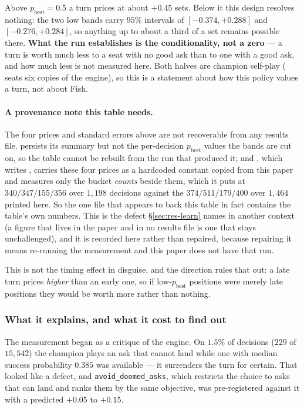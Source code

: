 \documentclass[11pt,letterpaper]{article}
\begin{document}
Above $p_{\text{best}} = 0.5$ a turn prices at about $+0.45$ sets. Below it
this design resolves nothing: the two low bands carry $95\%$ intervals of
$[-0.374, +0.288]$ and $[-0.276, +0.284]$, so anything up to about a third of a
set remains possible there. \textbf{What the run establishes is the
conditionality, not a zero} --- a turn is worth much less to a seat with no
good ask than to one with a good ask, and how much less is not measured here.
Both halves are champion self-play ( seats six
copies of the engine), so this is a statement about how this policy values a
turn, not about Fish.

\paragraph{A provenance note this table needs.} The four prices and standard
errors above are not recoverable from any results file.
 persists its summary but not the per-decision
$p_{\text{best}}$ values the bands are cut on, so the table cannot be rebuilt
from the run that produced it; and , which
writes , carries these four prices as a
hardcoded constant copied from this paper and measures only the bucket
\emph{counts} beside them, which it puts at $340/347/155/356$ over $1{,}198$
decisions against the $374/511/179/400$ over $1{,}464$ printed here. So the one
file that appears to back this table in fact contains the table's own numbers.
This is the defect \S\ref{sec:res-learn} names in another context (a figure
that lives in the paper and in no results file is one that stays unchallenged),
and it is recorded here rather than repaired, because repairing it means
re-running the measurement and this paper does not have that run.

This is not the timing effect in disguise, and the direction rules that out: a
late turn prices \emph{higher} than an early one, so if low-$p_{\text{best}}$
positions were merely late positions they would be worth more rather than
nothing.

\subsubsection{What it explains, and what it cost to find out}

The measurement began as a critique of the engine. On $1.5\%$ of decisions
($229$ of $15{,}542$) the champion plays an ask that cannot land while one with
median success probability $0.385$ was available --- it surrenders the turn for
certain. That looked like a defect, and \texttt{avoid\_doomed\_asks}, which
restricts the choice to asks that can land and ranks them by the same
objective, was pre-registered against it with a predicted $+0.05$ to $+0.15$.
\end{document}
